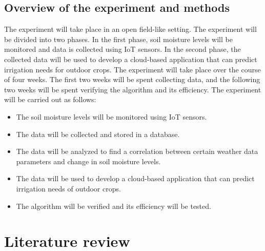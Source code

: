 \documentclass[11pt]{scrartcl} %
\begin{document}
\subsection{Overview of the experiment and methods}
The experiment will take place in an open field-like setting. The experiment will be divided into two phases. In the first phase, soil moisture levels will be monitored and data is collected using IoT sensors. In the second phase, the collected data will be used to develop a cloud-based application that can predict irrigation needs for outdoor crops. The experiment will take place over the course of four weeks. The first two weeks will be spent collecting data, and the following two weeks will be spent verifying the algorithm and its efficiency. The experiment will be carried out as follows:
\begin{itemize}
	\item The soil moisture levels will be monitored using IoT sensors.
	\item The data will be collected and stored in a database.
	\item The data will be analyzed to find a correlation between certain weather data parameters and change in soil moisture levels.
	\item The data will be used to develop a cloud-based application that can predict irrigation needs of outdoor crops.
	\item The algorithm will be verified and its efficiency will be tested.
\end{itemize}

\section{Literature review}
\end{document}
